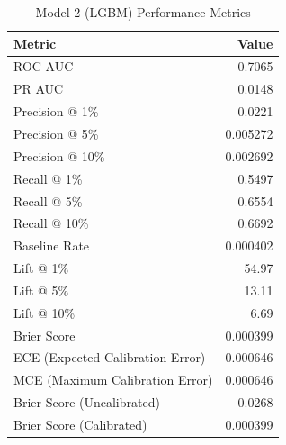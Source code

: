\begin{table}[h]
\centering
\begin{tabular}{lr}
\toprule
Metric & Value \\
\midrule
ROC AUC & 0.7065 \\
PR AUC & 0.0148 \\
Precision @ 1\% & 0.0221 \\
Precision @ 5\% & 0.005272 \\
Precision @ 10\% & 0.002692 \\
Recall @ 1\% & 0.5497 \\
Recall @ 5\% & 0.6554 \\
Recall @ 10\% & 0.6692 \\
Baseline Rate & 0.000402 \\
Lift @ 1\% & 54.97 \\
Lift @ 5\% & 13.11 \\
Lift @ 10\% & 6.69 \\
Brier Score & 0.000399 \\
ECE (Expected Calibration Error) & 0.000646 \\
MCE (Maximum Calibration Error) & 0.000646 \\
Brier Score (Uncalibrated) & 0.0268 \\
Brier Score (Calibrated) & 0.000399 \\
\bottomrule
\end{tabular}
\caption{Model 2 (LGBM) Performance Metrics}
\label{tab:model2_lgbm_metrics}
\end{table}
